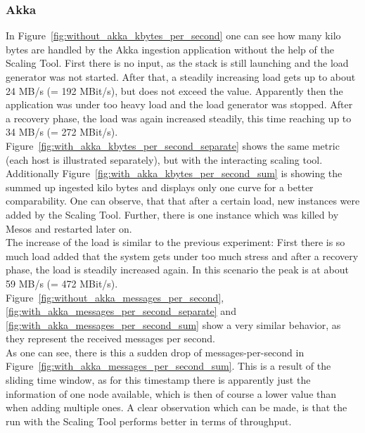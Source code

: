 \subsubsection{Akka}
In Figure~\ref{fig:without_akka_kbytes_per_second} one can see how many kilo bytes are handled by the Akka ingestion application without the help of the Scaling Tool.
First there is no input, as the stack is still launching and the load generator was not started.
After that, a steadily increasing load gets up to about 24 MB/s (= 192 MBit/s), but does not exceed the value.
Apparently then the application was under too heavy load and the load generator was stopped.
After a recovery phase, the load was again increased steadily, this time reaching up to 34 MB/s (= 272 MBit/s).\\
Figure~\ref{fig:with_akka_kbytes_per_second_separate} shows the same metric (each host is illustrated separately), but with the interacting scaling tool.
Additionally Figure~\ref{fig:with_akka_kbytes_per_second_sum} is showing the summed up ingested kilo bytes and displays only one curve for a better comparability.
One can observe, that that after a certain load, new instances were added by the Scaling Tool.
Further, there is one instance which was killed by Mesos and restarted later on.\\
The increase of the load is similar to the previous experiment: First there is so much load added that the system gets under too much stress and after a recovery phase, the load is steadily increased again.
In this scenario the peak is at about 59 MB/s (= 472 MBit/s).\\

Figure~\ref{fig:without_akka_messages_per_second}, \ref{fig:with_akka_messages_per_second_separate} and \ref{fig:with_akka_messages_per_second_sum} show a very similar behavior, as they represent the received messages per second.\\
As one can see, there is this a sudden drop of messages-per-second in Figure~\ref{fig:with_akka_messages_per_second_sum}.
This is a result of the sliding time window, as for this timestamp there is apparently just the information of one node available, which is then of course a lower value than when adding multiple ones.
A clear observation which can be made, is that the run with the Scaling Tool performs better in terms of throughput.\\

